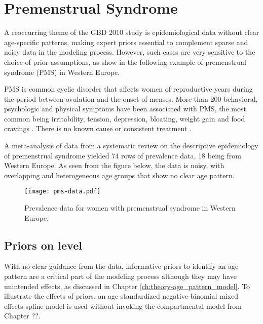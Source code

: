 \chapter{Premenstrual Syndrome}
\label{applications-priors_knots_select}

A reoccurring theme of the GBD 2010 study is epidemiological data without clear age-specific patterns, making expert priors essential to complement sparse and noisy data in the modeling process.  However, such cases are very sensitive to the choice of prior assumptions, as show in the following example of premenstrual syndrome (PMS) in Western Europe.

PMS is common cyclic disorder that affects women of reproductive years during the period between ovulation and the onset of menses.  More than 200 behavioral, psychologic and physical symptoms have been associated with PMS, the most common being irritability, tension, depression, bloating, weight gain and food cravings \cite{dickerson_premenstrual_2003, singh_incidence_1998}.  There is no known cause or consistent treatment \cite{goodale_alleviation_1990}.

A meta-analysis of data from a systematic review on the descriptive epidemiology of premenstrual syndrome yielded 74 rows of prevalence data, 18 being from Western Europe.  As seen from the figure below, the data is noisy, with overlapping and heterogeneous age groups that show no clear age pattern.

    \begin{figure}[h]
        \begin{center}
            \texttt{[image: pms-data.pdf]}
            \caption{Prevalence data for women with premenstrual syndrome in Western Europe.}
        \end{center}
        \label{fig:app-pms_data}
    \end{figure}

\section{Priors on level} \label{sec:app-priors_on_level}
With no clear guidance from the data, informative priors to identify an age pattern are a critical part of the modeling process although they may have unintended effects, as discussed in Chapter \ref{ch:theory-age_pattern_model}.  To illustrate the effects of priors, an age standardized negative-binomial mixed effects spline model is used without invoking the compartmental model from Chapter ??.

